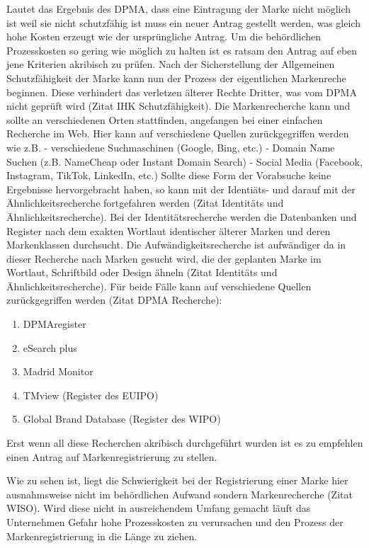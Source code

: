 Lautet das Ergebnis des DPMA, dass eine Eintragung der Marke nicht möglich ist weil sie nicht schutzfähig ist muss ein neuer Antrag gestellt werden, was gleich hohe Kosten erzeugt wie der ursprüngliche Antrag. Um die behördlichen Prozesskosten so gering wie möglich zu halten ist es ratsam den Antrag auf eben jene Kriterien akribisch zu prüfen.
Nach der Sicherstellung der Allgemeinen Schutzfähigkeit der Marke kann nun der Prozess der eigentlichen Markenreche beginnen. Diese verhindert das verletzen älterer Rechte Dritter, was vom DPMA nicht geprüft wird (Zitat IHK Schutzfähigkeit). Die Markenrecherche kann und sollte an verschiedenen Orten stattfinden, angefangen bei einer einfachen Recherche im Web. Hier kann auf verschiedene Quellen zurückgegriffen werden wie z.B. 
- verschiedene Suchmaschinen (Google, Bing, etc.)
- Domain Name Suchen (z.B. NameCheap oder Instant Domain Search)
- Social Media (Facebook, Instagram, TikTok, LinkedIn, etc.)
Sollte diese Form der Vorabsuche keine Ergebnisse hervorgebracht haben, so kann mit der Identiäts- und darauf mit der Ähnlichkeitsrecherche fortgefahren werden (Zitat Identitäts und Ähnlichkeitsrecherche). Bei der Identitätsrecherche werden die Datenbanken und Register nach dem exakten Wortlaut identischer älterer Marken und deren Markenklassen durchsucht. Die Aufwändigkeitsrecherche ist aufwändiger da in dieser Recherche nach Marken gesucht wird, die der geplanten Marke im Wortlaut, Schriftbild oder Design ähneln (Zitat Identitäts und Ähnlichkeitsrecherche). Für beide Fälle kann auf verschiedene Quellen zurückgegriffen werden (Zitat DPMA Recherche):

\begin{enumerate}
    \item DPMAregister
    \item eSearch plus
    \item Madrid Monitor
    \item TMview (Register des EUIPO)
    \item Global Brand Database (Register des WIPO)
\end{enumerate}

Erst wenn all diese Recherchen akribisch durchgeführt wurden ist es zu empfehlen einen Antrag auf Markenregistrierung zu stellen.

Wie zu sehen ist, liegt die Schwierigkeit bei der Registrierung einer Marke hier ausnahmsweise nicht im behördlichen Aufwand sondern Markenrecherche (Zitat WISO). Wird diese nicht in ausreichendem Umfang gemacht läuft das Unternehmen Gefahr hohe Prozesskosten zu verursachen und den Prozess der Markenregistrierung in die Länge zu ziehen. 